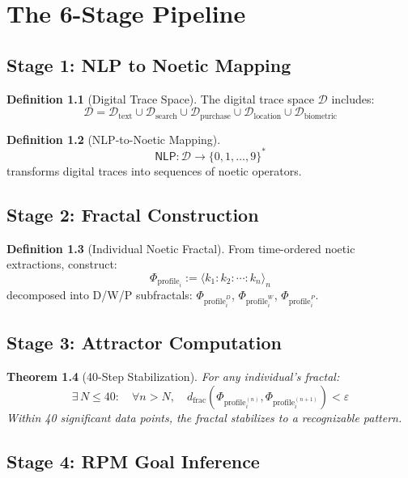\documentclass[11pt,twoside]{book}
\theoremstyle{definition}
\newtheorem{definition}{Definition}[chapter]
\theoremstyle{plain}
\newtheorem{theorem}[definition]{Theorem}
\theoremstyle{remark}
\newcommand{\NLP}{\mathsf{NLP}}
\newcommand{\DigitalTrace}{\mathcal{D}}
\newcommand{\ProfileFrac}{\Phi_{\mathrm{profile}}}
\begin{document}
\chapter{The 6-Stage Pipeline}
\label{ch:pred-pipeline}

\section{Stage 1: NLP to Noetic Mapping}

\begin{definition}[Digital Trace Space]
The digital trace space $\DigitalTrace$ includes:
\[
    \DigitalTrace = \DigitalTrace_{\text{text}} \cup \DigitalTrace_{\text{search}} \cup \DigitalTrace_{\text{purchase}} \cup \DigitalTrace_{\text{location}} \cup \DigitalTrace_{\text{biometric}}
\]
\end{definition}

\begin{definition}[NLP-to-Noetic Mapping]
\[
\boxed{
    \NLP : \DigitalTrace \longrightarrow \{0, 1, \ldots, 9\}^*
}
\]
transforms digital traces into sequences of noetic operators.
\end{definition}

\section{Stage 2: Fractal Construction}

\begin{definition}[Individual Noetic Fractal]
From time-ordered noetic extractions, construct:
\[
\boxed{
    \ProfileFrac_i := \langle k_1 : k_2 : \cdots : k_n \rangle_n
}
\]
decomposed into D/W/P subfractals: $\ProfileFrac_i^D$, $\ProfileFrac_i^W$, $\ProfileFrac_i^P$.
\end{definition}

\section{Stage 3: Attractor Computation}

\begin{theorem}[40-Step Stabilization]
For any individual's fractal:
\[
\boxed{
    \exists\, N \leq 40 : \quad \forall n > N, \quad
    d_{\mathrm{frac}}(\ProfileFrac_i^{(n)}, \ProfileFrac_i^{(n+1)}) < \varepsilon
}
\]
Within 40 significant data points, the fractal stabilizes to a recognizable pattern.
\end{theorem}

\section{Stage 4: RPM Goal Inference}
\end{document}
